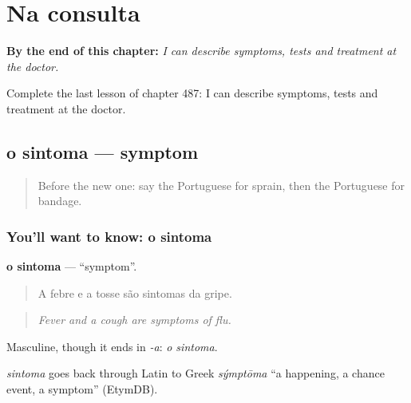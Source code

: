 
\chapter{Na consulta}
\label{ch:pt-na-consulta}

\begin{chapteropening}
\textbf{By the end of this chapter:} \emph{I can describe symptoms, tests and treatment at the doctor.}

Complete the last lesson of chapter 487: I can describe symptoms, tests and treatment at the doctor.
\end{chapteropening}

\section[o sintoma]{o sintoma — symptom}

\label{lesson:PT-C487-sintoma}



\begin{quote}
Before the new one: say the Portuguese for sprain, then the Portuguese for bandage.
\end{quote}

\subsection*{You'll want to know: o sintoma}
\textbf{o sintoma} — \textquotedblleft{}symptom\textquotedblright{}.

\begin{quote}
A febre e a tosse são sintomas da gripe.
\end{quote}

\begin{quote}
\emph{Fever and a cough are symptoms of flu.}
\end{quote}

Masculine, though it ends in \emph{-a}: \emph{o sintoma}.

\begin{cousinweb}
\emph{sintoma} goes back through Latin to Greek \emph{sýmptōma} \textquotedblleft{}a happening, a chance event, a symptom\textquotedblright{} (EtymDB).
\end{cousinweb}

